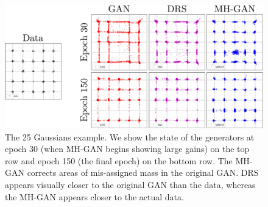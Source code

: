 \begin{figure}[tbp]
    \centering
    \includegraphics[width=1.0\linewidth]{figures/mog_unified.pdf}
    \caption{{\small
    The 25 Gaussians example.
    We show the state of the generators at epoch 30 (when MH-GAN begins showing large gains) on the top row and epoch 150 (the final epoch) on the bottom row.
    The MH-GAN corrects areas of mis-assigned mass in the original GAN\@.
    DRS appears visually closer to the original GAN than the data, whereas the MH-GAN appears closer to the actual data.
    }}
    \label{fig:mog_example}
\end{figure}

